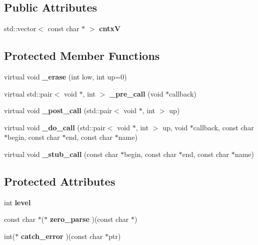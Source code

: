 \subsection*{Public Attributes}
\begin{DoxyCompactItemize}
\item 
\mbox{\label{classbnf_1_1___base_a305816876d6e007b3216289fa5cb763b}} 
std\+::vector$<$ const char $\ast$ $>$ {\bfseries cntxV}
\end{DoxyCompactItemize}
\subsection*{Protected Member Functions}
\begin{DoxyCompactItemize}
\item 
\mbox{\label{classbnf_1_1___base_a24b2c70e93327da9f342c11f7a8a61d1}} 
virtual void {\bfseries \+\_\+erase} (int low, int up=0)
\item 
\mbox{\label{classbnf_1_1___base_a00e146f614347f5cd256da4972b2b021}} 
virtual std\+::pair$<$ void $\ast$, int $>$ {\bfseries \+\_\+pre\+\_\+call} (void $\ast$callback)
\item 
\mbox{\label{classbnf_1_1___base_ab1a1132dd9a8294a9ec7ae9e9d908f2b}} 
virtual void {\bfseries \+\_\+post\+\_\+call} (std\+::pair$<$ void $\ast$, int $>$ up)
\item 
\mbox{\label{classbnf_1_1___base_ac63cafa36d2b032f030950622b59bde7}} 
virtual void {\bfseries \+\_\+do\+\_\+call} (std\+::pair$<$ void $\ast$, int $>$ up, void $\ast$callback, const char $\ast$begin, const char $\ast$end, const char $\ast$name)
\item 
\mbox{\label{classbnf_1_1___base_a088e0841175a63af7d6867728fb67857}} 
virtual void {\bfseries \+\_\+stub\+\_\+call} (const char $\ast$begin, const char $\ast$end, const char $\ast$name)
\end{DoxyCompactItemize}
\subsection*{Protected Attributes}
\begin{DoxyCompactItemize}
\item 
\mbox{\label{classbnf_1_1___base_a453778efab1591833f58f9e87ce1847c}} 
int {\bfseries level}
\item 
\mbox{\label{classbnf_1_1___base_a2c4c10392aceaaae362f05a10c76ee95}} 
const char $\ast$($\ast$ {\bfseries zero\+\_\+parse} )(const char $\ast$)
\item 
\mbox{\label{classbnf_1_1___base_afbb5aeec84c9cea8874db4d3f6911ce9}} 
int($\ast$ {\bfseries catch\+\_\+error} )(const char $\ast$ptr)
\end{DoxyCompactItemize}
